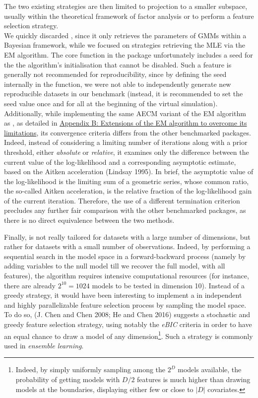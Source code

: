 The two existing strategies are then limited to projection to a smaller subspace, usually within the theoretical framework of factor analysis or to perform a feature selection strategy.\\
We quickly discarded , since it only retrieves the parameters of GMMs within a Bayesian framework, while we focused on strategies retrieving the MLE via the EM algorithm. The core function  in the  package unfortunately includes a seed for the the algorithm's initialisation that cannot be disabled. Such a feature is generally not recommended for reproducibility, since by defining the seed internally in the function, we were not able to independently generate new reproducible datasets in our benchmark (instead, it is recommended to set the seed value once and for all at the beginning of the virtual simulation). Additionally, while implementing the same AECM variant of the EM algorithm as , as detailed in \protect\hyperlink{appendix-b-extensions-of-the-em-algorithm-to-overcome-its-limitations}{Appendix B: Extensions of the EM algorithm to overcome its limitations}, its convergence criteria differs from the other benchmarked packages. Indeed, instead of considering a limiting number of iterations along with a prior threshold, either \emph{absolute} or \emph{relative}, it examines only the difference between the current value of the log-likelihood and a corresponding asymptotic estimate, based on the Aitken acceleration (Lindsay 1995). In brief, the asymptotic value of the log-likelihood is the limiting sum of a geometric series, whose common ratio, the so-called Aitken acceleration, is the relative fraction of the log-likelihood gain of the current iteration. Therefore, the use of a different termination criterion precludes any further fair comparison with the other benchmarked packages, as there is no direct equivalence between the two methods.

Finally,  is not really tailored for datasets with a large number of dimensions, but rather for datasets with a small number of observations. Indeed, by performing a sequential search in the model space in a forward-backward process (namely by adding variables to the null model till we recover the full model, with all features), the algorithm requires intensive computational resources (for instance, there are already \(2^{10}=1024\) models to be tested in dimension 10). Instead of a greedy strategy, it would have been interesting to implement a in independent and highly parallelizable feature selection process by sampling the model space. To do so, (J. Chen and Chen 2008; He and Chen 2016) suggests a stochastic and greedy feature selection strategy, using notably the \emph{eBIC} criteria in order to have an equal chance to draw a model of any dimension\footnote{Indeed, by simply uniformly sampling among the \(2^D\) models available, the probability of getting models with \(D/2\) features is much higher than drawing models at the boundaries, displaying either few or close to \(|D|\) covariates.}. Such a strategy is commonly used in \emph{ensemble learning}.

